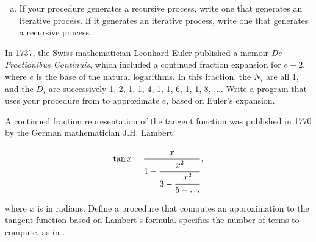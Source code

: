\begin{exerciseGroup}
\begin{enumerate}[a.]
\noindent
for successive values of .  How large must you make  in order
to get an approximation that is accurate to 4 decimal places?

\item
If your  procedure generates a recursive process, write one
that generates an iterative process.  If it generates an iterative process,
write one that generates a recursive process.

\end{enumerate}

\label{Exercise 1.38}
 In 1737, the Swiss mathematician
Leonhard Euler published a memoir \textit{De Fractionibus Continuis}, which
included a continued fraction expansion for \( e - 2 \), where \( e \) is the base
of the natural logarithms.  In this fraction, the \( N_i \) are all 1, and
the \( D_i \) are successively 1, 2, 1, 1, 4, 1, 1, 6, 1, 1, 8, \( \dots \).
Write a program that uses your  procedure from 
to approximate \( e \), based on Euler's expansion.

\label{Exercise 1.39}
 A continued fraction
representation of the tangent function was published in 1770 by the German
mathematician J.H. Lambert:

$$ {\tan x} = \cfrac{x}{1 - \cfrac{x^2}{3 - \cfrac{x^2}{5 - \dots}}}\,, $$

\noindent
where \( x \) is in radians.  Define a procedure  that
computes an approximation to the tangent function based on Lambert's formula.
 specifies the number of terms to compute, as in .
\end{exerciseGroup}

